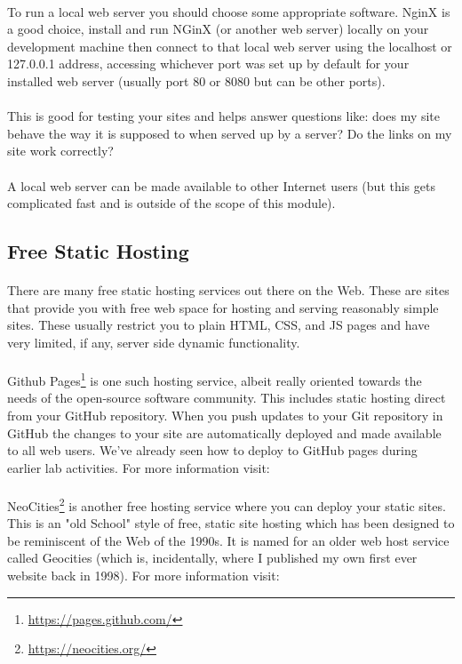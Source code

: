 \paragraph{} To run a local web server you should choose some appropriate software. NginX is a good choice, install and run NGinX (or another web server) locally on your development machine then connect to that local web server using the localhost or 127.0.0.1 address, accessing whichever port was set up by default for your installed web server (usually port 80 or 8080 but can be other ports).
\paragraph{} This is good for testing your sites and helps answer questions like: does my site behave the way it is supposed to when served up by a server? Do the links on my site work correctly?
\paragraph{} A local web server can be made available to other Internet users (but this gets complicated fast and is outside of the scope of this module).


\subsection{Free Static Hosting}
\paragraph{} There are many free static hosting services out there on the Web. These are sites that provide you with free web space for hosting and serving reasonably simple sites. These usually restrict you to plain HTML, CSS, and JS pages and have very limited, if any, server side dynamic functionality.
\paragraph{} Github Pages\footnote{\url{https://pages.github.com/}} is one such hosting service, albeit really oriented towards the needs of the open-source software community. This includes static hosting direct from your GitHub repository. When you push updates to your Git repository in GitHub the changes to your site are automatically deployed and made available to all web users. We've already seen how to deploy to GitHub pages during earlier lab activities. For more information visit:
\paragraph{} NeoCities\footnote{\url{https://neocities.org/}} is another free hosting service where you can deploy your static sites. This is an "old School" style of free, static site hosting which has been designed to be reminiscent of the Web of the 1990s. It is named for an older web host service called Geocities (which is, incidentally, where I published my own first ever website back in 1998). For more information visit:
